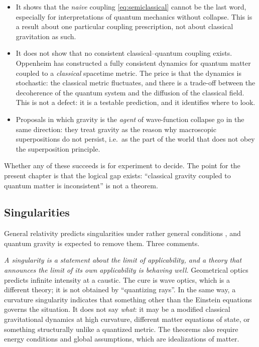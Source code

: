 \begin{itemize}
\item It shows that the \emph{naive} coupling \eqref{eq:semiclassical}
  cannot be the last word, especially for interpretations of quantum
  mechanics without collapse. This is a result about one particular
  coupling prescription, not about classical gravitation as such.
\item It does not show that no consistent classical--quantum coupling
  exists. Oppenheim \cite{qg:oppenheim} has constructed a fully
  consistent dynamics for quantum matter coupled to a \emph{classical}
  spacetime metric. The price is that the dynamics is stochastic: the
  classical metric fluctuates, and there is a trade-off between the
  decoherence of the quantum system and the diffusion of the classical
  field. This is not a defect: it is a testable prediction, and it
  identifies where to look.
\item Proposals in which gravity is the \emph{agent} of wave-function
  collapse \cite{qg:diosi84,qg:penrose} go in the same direction: they
  treat gravity as the reason why macroscopic superpositions do not
  persist, i.e.\ as the part of the world that does not obey the
  superposition principle.
\end{itemize}

Whether any of these succeeds is for experiment to decide. The point for
the present chapter is that the logical gap exists: ``classical gravity
coupled to quantum matter is inconsistent'' is not a theorem.

\subsection{Singularities}

General relativity predicts singularities under rather general
conditions \cite{qg:hawkingpenrose}, and quantum gravity is expected to
remove them. Three comments.

\emph{A singularity is a statement about the limit of applicability, and a
theory that announces the limit of its own applicability is behaving
well.} Geometrical optics predicts infinite intensity at a caustic. The
cure is wave optics, which is a different theory; it is not obtained by
``quantizing rays''. In the same way, a curvature singularity indicates
that something other than the Einstein equations governs the situation.
It does not say \emph{what}: it may be a modified classical gravitational
dynamics at high curvature, different matter equations of state, or
something structurally unlike a quantized metric. The theorems also
require energy conditions and global assumptions, which are
idealizations of matter.

